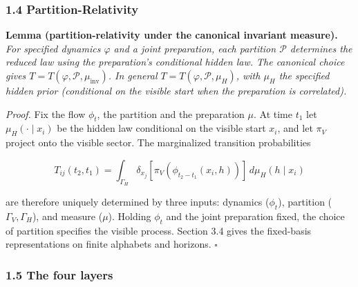 \documentclass[
]{article}
\begin{document}
\hypertarget{partition-relativity}{%
\subsubsection{1.4 Partition-Relativity}\label{partition-relativity}}

\textbf{Lemma (partition-relativity under the canonical invariant
measure).} \emph{For specified dynamics \(\varphi\) and a joint
preparation, each partition \(\mathcal{P}\) determines the reduced law
using the preparation's conditional hidden law. The canonical choice
gives \(T = T(\varphi, \mathcal{P}, \mu_{\text{inv}})\). In general
\(T = T(\varphi, \mathcal{P}, \mu_H)\), with \(\mu_H\) the specified
hidden prior (conditional on the visible start when the preparation is
correlated).}

\emph{Proof.} Fix the flow \(\phi_t\), the partition and the preparation
\(\mu\). At time \(t_1\) let \(\mu_H(\cdot\mid x_i)\) be the hidden law
conditional on the visible start \(x_i\), and let \(\pi_V\) project onto
the visible sector. The marginalized transition probabilities

\[T_{ij}(t_2, t_1) = \int_{\Gamma_H} \delta_{x_j}[\pi_V(\phi_{t_2-t_1}(x_i, h))] \, d\mu_H(h\mid x_i)\]

are therefore uniquely determined by three inputs: dynamics
(\(\phi_t\)), partition (\(\Gamma_V, \Gamma_H\)), and measure (\(\mu\)).
Holding \(\phi_t\) and the joint preparation fixed, the choice of
partition specifies the visible process. Section 3.4 gives the
fixed-basis representations on finite alphabets and horizons.
\(\square\)

\hypertarget{the-four-layers}{%
\subsubsection{1.5 The four layers}\label{the-four-layers}}
\end{document}
